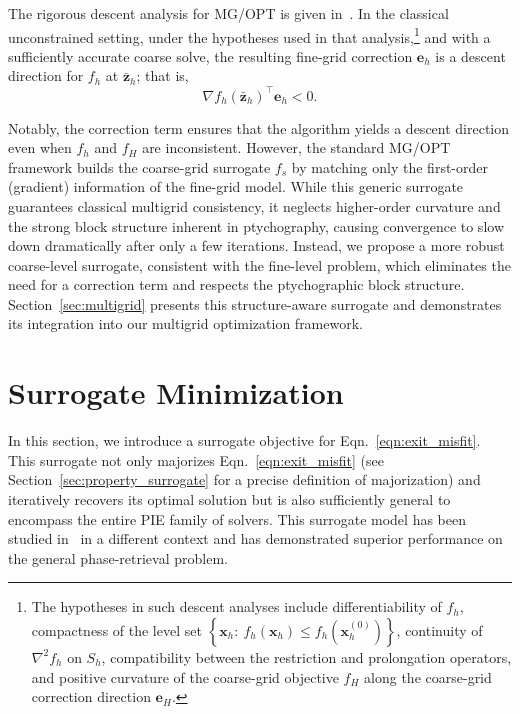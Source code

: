 \documentclass{article}
\numberwithin{equation}{section}
\begin{document}
The rigorous descent analysis for MG/OPT is given in~\cite{MGOPT}. In the classical unconstrained setting, {under the hypotheses used in that analysis,}\footnote{{The hypotheses in such descent analyses include differentiability of $f_h$, compactness of the level set $\left\{\bm{x}_h:\ f_h(\bm{x}_h)\le f_h\left(\bm{x}_h^{(0)}\right)\right\}$, continuity of $\nabla^2 f_h$ on $S_h$, compatibility between the restriction and prolongation operators, and positive curvature of the coarse-grid objective $f_H$ along the coarse-grid correction direction $\bm{e}_H$.}} and with a sufficiently accurate coarse solve, the resulting fine-grid correction $\bm{e}_h$ is a descent direction for $f_h$ at $\bar{\bm{z}}_h$; that is,
\begin{equation*}
    \nabla f_h(\bar{\bm{z}}_h)^\top \bm{e}_h < 0.
\end{equation*}

Notably, the correction term ensures that the algorithm yields a descent direction even when $f_h$ and $f_H$ are inconsistent. However, the standard MG/OPT framework builds the coarse-grid surrogate $f_s$ by matching only the first-order (gradient) information of the fine-grid model. While this generic surrogate guarantees classical multigrid consistency, it neglects higher-order curvature and the strong block structure inherent in ptychography, causing convergence to slow down dramatically after only a few iterations. Instead, we propose a more robust coarse-level surrogate, consistent with the fine-level problem, which eliminates the need for a correction term and respects the ptychographic block structure. Section~\ref{sec:multigrid} presents this structure-aware surrogate and demonstrates its integration into our multigrid optimization framework.


\section{Surrogate Minimization}\label{sec:surrogate}
In this section, we introduce a surrogate objective for  Eqn.~\eqref{eqn:exit_misfit}. This surrogate not only majorizes  Eqn.~\eqref{eqn:exit_misfit} (see Section~\ref{sec:property_surrogate} for a precise definition of majorization) and iteratively recovers its optimal solution but is also sufficiently general to encompass the entire PIE family of solvers. This surrogate model has been studied in~\cite{MM_phaseretrieval} in a different context and has demonstrated superior performance on the general phase-retrieval problem.
\end{document}
